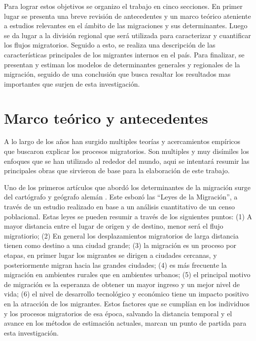 \documentclass[12pt,a4paper]{article}
\begin{document}
Para lograr estos objetivos se organizo el trabajo en cinco secciones. En primer lugar se presenta una breve revisión de antecedentes y un marco teórico ateniente a estudios relevantes en el ámbito de las migraciones y sus determinantes. Luego se da lugar a la división regional que será utilizada para caracterizar y cuantificar los flujos migratorios. Seguido a esto, se realiza una descripción de las características principales de los migrantes internos en el país. Para finalizar, se presentan y estiman los modelos de determinantes generales y regionales de la migración, seguido de una conclusión que busca resaltar los resultados mas importantes que surjen de esta investigación.


\section{Marco teórico y antecedentes}
A lo largo de los años han surgido multiples teorías y acercamientos empíricos que buscaron explicar los procesos migratorios. Son multiples y muy disímiles los enfoques que se han utilizado al rededor del mundo, aqui se intentará resumir las principales obras que sirvieron de base para la elaboración de este trabajo.

Uno de los primeros artículos que abordó los determinantes de la migración surge del cartógrafo y geógrafo alemán \textcite{ravenstein_laws_1885}. Este esbozó las “Leyes de la Migración”, a través de un estudio realizado en base a un análisis cuantitativo de un censo poblacional. Estas leyes se pueden resumir a través de los siguientes puntos: (1) A mayor distancia entre el lugar de origen y de destino, menor será el flujo migratiorio; (2) En general los desplazamientos migratorios de larga distancia tienen como destino a una ciudad grande; (3) la migración es un proceso por etapas, en primer lugar los migrantes se dirigen a ciudades cercanas, y posteriormente migran hacia las grandes ciudades; (4) es más frecuente la migración en ambientes rurales que en ambientes urbanos; (5) el principal motivo de migración es la esperanza de obtener un mayor ingreso y un mejor nivel de vida; (6) el nivel de desarrollo tecnológico y económico tiene un impacto positivo en la atracción de los migrantes. Estos factores que se cumplían en  los individuos y los procesos migratorios de esa época, salvando la distancia temporal y el avance en los métodos de estimación actuales, marcan un punto de partida para esta investigación.
\end{document}
